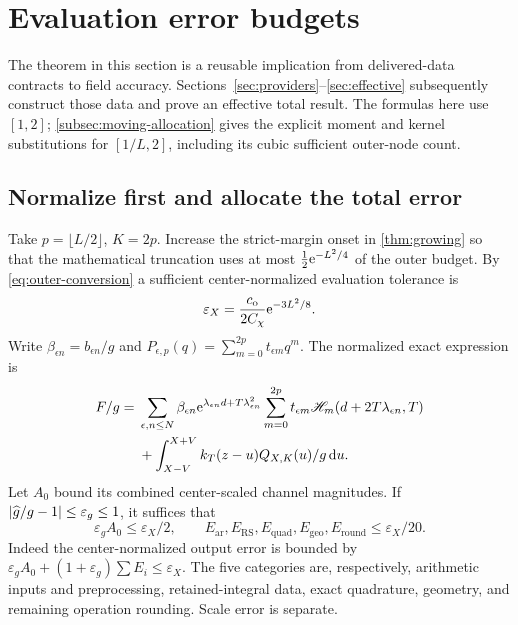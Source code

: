 \section{Evaluation error budgets}
\label{sec:evaluation}
The theorem in this section is a reusable implication from delivered-data
contracts to field accuracy. Sections~\ref{sec:providers}--\ref{sec:effective}
subsequently construct those data and prove an effective total result.
The formulas here use \([1,2]\); \cref{subsec:moving-allocation} gives the
explicit moment and kernel substitutions for \([1/L,2]\), including its
cubic sufficient outer-node count.

\subsection{Normalize first and allocate the total error}
Take \(p=\lfloor L/2\rfloor\), \(K=2p\).
Increase the strict-margin onset in \cref{thm:growing} so that
the mathematical truncation uses at most
\(\tfrac12\mathrm e^{-L^2/4}\) of the outer budget.
By \eqref{eq:outer-conversion} a sufficient center-normalized
evaluation tolerance is
\begin{equation}
 \varepsilon_X=\frac{c_{\mathrm o}}{2C_\chi}\mathrm e^{-3L^2/8}.
 \label{eq:epsilonX}
\end{equation}
Write \(\beta_{\epsilon n}=b_{\epsilon n}/g\) and
\(P_{\epsilon,p}(q)=\sum_{m=0}^{2p}t_{\epsilon m}q^m\).
The normalized exact expression is
\begin{align}
 F/g={}&\sum_{\epsilon,n\le N}\beta_{\epsilon n}
       \mathrm e^{\lambda_{\epsilon n}d+T\lambda_{\epsilon n}^2}
       \sum_{m=0}^{2p}t_{\epsilon m}
              \mathscr H_m(d+2T\lambda_{\epsilon n},T)\nonumber\\
 &+\int_{X-V}^{X+V}k_T(z-u)Q_{X,K}(u)/g\,\mathrm d u.
 \label{eq:normalized-evaluation}
\end{align}
Let \(A_0\) bound its combined center-scaled channel magnitudes.
If \(\lvert \widehat g/g-1\rvert\le\varepsilon_g\le1\), it suffices that
\begin{equation}
 \varepsilon_g A_0\le\varepsilon_X/2,\qquad
 E_{\mathrm{ar}},E_{\mathrm{RS}},E_{\mathrm{quad}},
 E_{\mathrm{geo}},E_{\mathrm{round}}\le\varepsilon_X/20.
 \label{eq:allocation}
\end{equation}
Indeed the center-normalized output error is bounded by
\(\varepsilon_gA_0+(1+\varepsilon_g)\sum E_i\le\varepsilon_X\).
The five categories are, respectively, arithmetic inputs and
preprocessing, retained-integral data, exact quadrature, geometry,
and remaining operation rounding. Scale error is separate.

